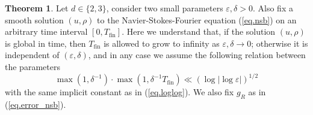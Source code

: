 \documentclass[10pt, reqno]{amsart}
\theoremstyle{definition}
\newtheorem{mainthm}{Theorem}
\theoremstyle{remark}
\numberwithin{equation}{section}
\begin{document}
\begin{mainthm}
\label{th.main2}
Let $d\in\{2,3\}$, consider two small parameters $\varepsilon,\delta>0$. Also fix a smooth solution $(u,\rho)$ to the Navier-Stokes-Fourier equation (\ref{eq.nsb}) on an arbitrary time interval $[0,T_{\mathrm{fin}}]$. Here we understand that, if the solution $(u,\rho)$ is global in time, then $T_{\mathrm{fin}}$ is allowed to grow to infinity as $\varepsilon,\delta\to 0$; otherwise it is independent of $(\varepsilon,\delta)$, and in any case we assume the following relation between the parameters
\begin{equation}\label{eq.loglog_nsb}
\max(1,\delta^{-1})\cdot\max(1,{\delta^{-1}T_{\mathrm{fin}}})\ll (\log|\log\varepsilon|)^{1/2}
\end{equation} with the same implicit constant as in (\ref{eq.loglog}). We also fix $g_R$ as in (\ref{eq.error_nsb}).


\end{mainthm}
\end{document}
